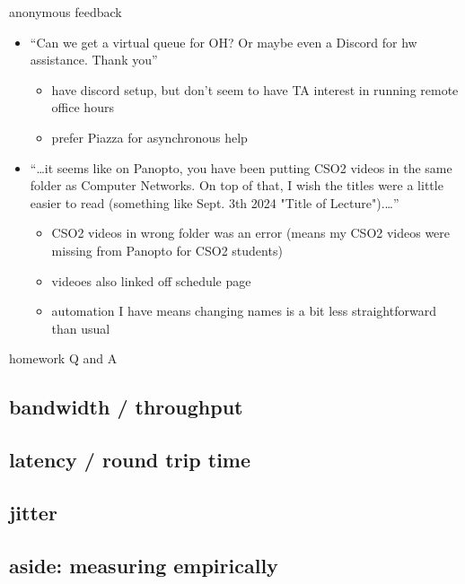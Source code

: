\begin{frame}{anonymous feedback}
    \begin{itemize}
    \item ``Can we get a virtual queue for OH? Or maybe even a Discord for hw assistance. Thank you''
        \begin{itemize}
        \item have discord setup, but don't seem to have TA interest in running remote office hours
        \item prefer Piazza for asynchronous help
        \end{itemize}
    \item ``\ldots it seems like on Panopto, you have been putting CSO2 videos in the same folder as Computer Networks. On top of that, I wish the titles were a little easier to read (something like Sept. 3th 2024 "Title of Lecture").\ldots''
        \begin{itemize}
        \item CSO2 videos in wrong folder was an error (means my CSO2 videos were missing from Panopto for CSO2 students)
        \item videoes also linked off schedule page
        \item automation I have means changing names is a bit less straightforward than usual
        \end{itemize}
    \end{itemize}
\end{frame}

\begin{frame}{homework Q and A}
\end{frame}


\subsection{bandwidth / throughput}


\subsection{latency / round trip time}


\subsection{jitter}


\subsection{aside: measuring empirically}


